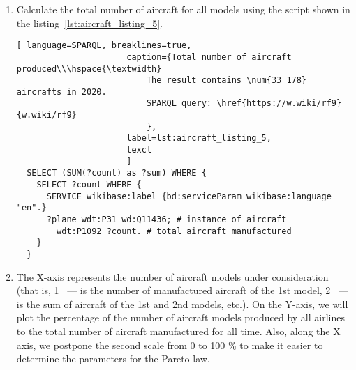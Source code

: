 \begin{enumerate} 
  \item Calculate the total number of aircraft for all models using the script shown in the listing~\ref{lst:aircraft_listing_5}.

  \begin{lstlisting}[ language=SPARQL, breaklines=true,  
                      caption={Total number of aircraft produced\\\hspace{\textwidth}
                          The result contains \num{33 178} aircrafts in 2020.
                          SPARQL query: \href{https://w.wiki/rf9}{w.wiki/rf9}
                          },
                      label=lst:aircraft_listing_5,
                      texcl 
                      ]
  SELECT (SUM(?count) as ?sum) WHERE {
    SELECT ?count WHERE {
      SERVICE wikibase:label {bd:serviceParam wikibase:language "en".}
      ?plane wdt:P31 wd:Q11436; # instance of aircraft
        wdt:P1092 ?count. # total aircraft manufactured
    }
  }
  \end{lstlisting}

  \item The X-axis represents the number of aircraft models under consideration (that is, 1 ~--- is the number of manufactured aircraft of the 1st 
  model, 2 ~--- is the sum of aircraft of the 1st and 2nd models, etc.). On the Y-axis, we will plot the percentage of the number of aircraft models 
  produced by all airlines to the total number of aircraft manufactured for all time. Also, along the X axis, we postpone the second scale from 
  0 to 100 \% to make it easier to determine the parameters for the Pareto law.
\end{enumerate}

\label{question:aircraft_question_2}

